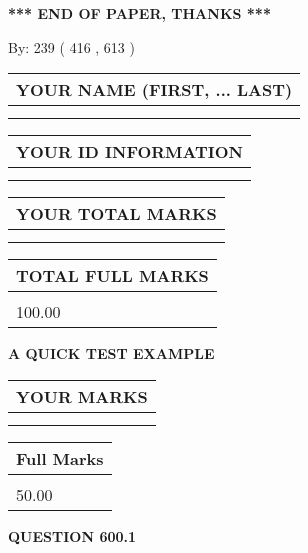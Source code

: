 \documentclass[12pt]{article}
\begin{document}
\vspace{1.0in} 
{\textbf{\large{ *** END OF PAPER, THANKS *** }}} 
   
   
\hspace{1.0in} By: 
 239 ( 416 ,  613 )
   
   
   
   
\newpage 
\setcounter{page}{ 
   600001 } 
   
   
   
   
\noindent\begin{tabular}{|l|}
\hline
YOUR NAME (FIRST, ... LAST)  \\
\hline
 \\ 
 \\ 
\hline
\end{tabular}
\hspace{0.05in} \begin{tabular}{|l|}
\hline
 YOUR   ID   INFORMATION  \\
\hline
 \\ 
 \\ 
\hline
\end{tabular}
   
   
\vspace{0.2in}\noindent\begin{tabular}{|l|}
\hline
YOUR TOTAL MARKS  \\
\hline
 \\ 
 \\ 
\hline
\end{tabular}
\hspace{0.05in} \begin{tabular}{|l|}
\hline
TOTAL FULL MARKS  \\
\hline
 \\ 
100.00 \\
\hline
\end{tabular}
   
   
 \vspace{0.2in}
{\LARGE {\textbf{ A QUICK TEST EXAMPLE}}}
   
   
  
\vspace{0.2in}
  
\noindent\begin{tabular}{|l|}
\hline
 YOUR MARKS  \\
\hline
 \\ 
 \\ 
\hline
\end{tabular}
\hspace{0.05in} \begin{tabular}{|l|}
\hline
 Full Marks  \\
\hline
 \\ 
50.00 \\
\hline
\end{tabular}
{\textbf{\Large{QUESTION
600.1 
}}}
  
\end{document}
